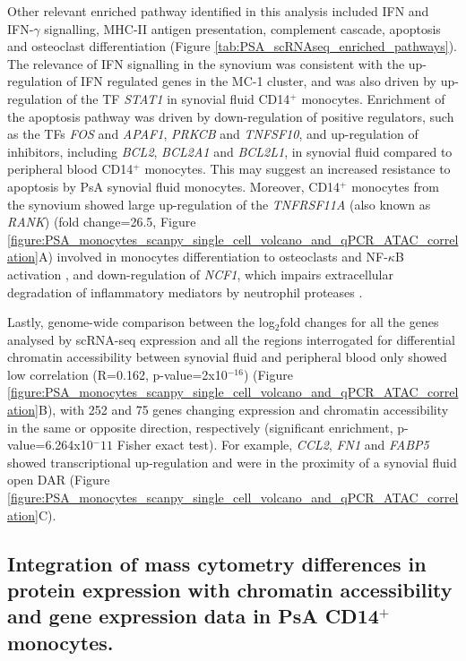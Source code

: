 Other relevant enriched pathway identified in this analysis included IFN and IFN-$\gamma$ signalling, MHC-II antigen presentation, complement cascade, apoptosis and osteoclast differentiation (Figure \ref{tab:PSA_scRNAseq_enriched_pathways}). The relevance of IFN signalling in the synovium was consistent with the up-regulation of IFN regulated genes in the MC-1 cluster, and was also driven by up-regulation of the TF \textit{STAT1} in synovial fluid CD14$^+$ monocytes. Enrichment of the apoptosis pathway was driven by down-regulation of positive regulators, such as the TFs \textit{FOS} and \textit{APAF1}, \textit{PRKCB} and \textit{TNFSF10}, and up-regulation of inhibitors, including \textit{BCL2}, \textit{BCL2A1} and \textit{BCL2L1}, in synovial fluid compared to peripheral blood CD14$^+$ monocytes. This may suggest an increased resistance to apoptosis by PsA synovial fluid monocytes. Moreover, CD14$^+$ monocytes from the synovium showed large up-regulation of the \textit{TNFRSF11A} (also known as \textit{RANK}) (fold change=26.5, Figure \ref{figure:PSA_monocytes_scanpy_single_cell_volcano_and_qPCR_ATAC_correlation}A) involved in monocytes differentiation to osteoclasts and NF-$\kappa$B activation \parencite{Mensah2008}, and down-regulation of \textit{NCF1}, which impairs extracellular degradation of inflammatory mediators by neutrophil proteases \parencite{Schauer2014}.
                                      

Lastly, genome-wide comparison between the log$_2$fold changes for all the genes analysed by scRNA-seq expression and all the regions interrogated for differential chromatin accessibility between synovial fluid and peripheral blood only showed low correlation (R=0.162, p-value=2x10$^{-16}$) (Figure \ref{figure:PSA_monocytes_scanpy_single_cell_volcano_and_qPCR_ATAC_correlation}B), with 252 and 75 genes changing expression and chromatin accessibility in the same or opposite direction, respectively (significant enrichment, p-value=6.264x10$^-11$ Fisher exact test). For example, \textit{CCL2}, \textit{FN1} and \textit{FABP5} showed transcriptional up-regulation and were in the proximity of a synovial fluid open DAR (Figure \ref{figure:PSA_monocytes_scanpy_single_cell_volcano_and_qPCR_ATAC_correlation}C).


\subsection{Integration of mass cytometry differences in protein expression with chromatin accessibility and gene expression data in PsA CD14$^+$ monocytes.}
\label{cytof}

